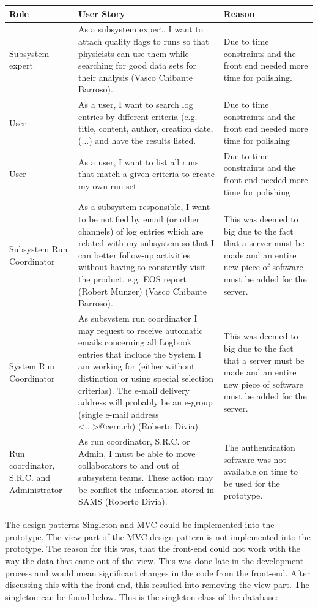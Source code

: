 \documentclass[paper=a4, fontsize=11pt,twoside]{scrartcl}	%
\begin{document}
\begin{longtable}{ | p{3cm} | p{7cm} | p{3cm}|}
\hline
Role & User Story & Reason \\ \hline
Subsystem expert & As a subsystem expert, I want to attach quality flags to runs so that physicists can use them while searching for good data sets for their analysis (Vasco Chibante Barroso).& Due to time constraints and the front end needed more time for polishing. \\ \hline
User & As a user, I want to search log entries by different criteria (e.g. title, content, author, creation date,(...) and have the results listed. & Due to time constraints and the front end needed more time for polishing \\ \hline
User &  As a user, I want to list all runs that match a given criteria to create my own run set.& Due to time constraints and the front end needed more time for polishing \\ \hline
Subsystem Run Coordinator &  As a subsystem responsible, I want to be notified by email (or other channels) of log entries which are related with my subsystem so that I can better follow-up activities without having to constantly visit the product, e.g. EOS report (Robert Munzer) (Vasco Chibante Barroso). & This was deemed to big due to the fact that a server must be made and an entire new piece of software must be added for the server. \\ \hline
System Run Coordinator & As subsystem run coordinator I may request to receive automatic emails concerning all Logbook entries that include the System I am working for (either without distinction or using special selection criterias). The e-mail delivery address will probably be an e-group (single e-mail address <...>@cern.ch) (Roberto Divia). & This was deemed to big due to the fact that a server must be made and an entire new piece of software must be added for the server. \\ \hline
Run coordinator, S.R.C. and Administrator &  As run coordinator, S.R.C. or Admin, I must be able to move collaborators to and out of subsystem teams. These action may be conflict the information stored in SAMS (Roberto Divia). & The authentication software was not available on time to be used for the prototype. \\ \hline
\end{longtable}
The design patterns Singleton and MVC could be implemented into the prototype. The view part of the MVC design pattern is not implemented into the prototype. The reason for this was, that the front-end could not work with the way the data that came out of the view. This was done late in the development process and would mean significant changes in the code from the front-end. After discussing this with the front-end, this resulted into removing the view part. The singleton can be found below. This is the singleton class of the database:
\end{document}
